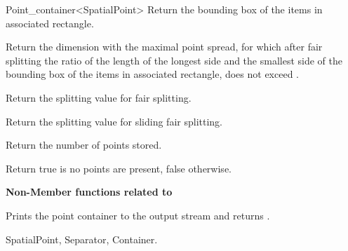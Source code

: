 \begin{ccRefClass}{Point_container<SpatialPoint>}
{Return the bounding box of the items in associated rectangle.}

{Return the dimension with the maximal point spread, for which after fair splitting
the ratio of the length of the longest side and the smallest side of the bounding box of
the items in associated rectangle,
does not exceed .}

{Return the splitting value for fair splitting.}

{Return the splitting value for sliding fair splitting.}

{
Return the number of points stored.
}

{
Return true is no points are present, false otherwise.
}



\begin{ccAdvanced}

{\bf Non-Member functions related to }

\ccGlueBegin
{}
{Prints the point container  to the output stream  and returns .}
\ccGlueEnd

\end{ccAdvanced}

\ccSeeAlso

SpatialPoint, Separator, Container.

\end{ccRefClass}


